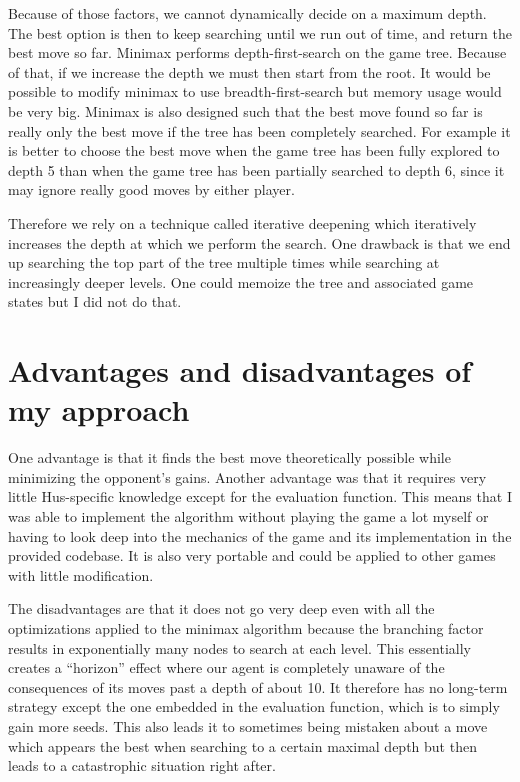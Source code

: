 \documentclass{article}
\begin{document}
Because of those factors, we cannot dynamically decide on a maximum depth. The best option is then to keep searching until we run out of time, and return the best move so far. Minimax performs depth-first-search on the game tree. Because of that, if we increase the depth we must then start from the root. It would be possible to modify minimax to use breadth-first-search but memory usage would be very big. Minimax is also designed such that the best move found so far is really only the best move if the tree has been completely searched. For example it is better to choose the best move when the game tree has been fully explored to depth 5 than when the game tree has been partially searched to depth 6, since it may ignore really good moves by either player.

Therefore we rely on a technique called iterative deepening which iteratively increases the depth at which we perform the search. One drawback is that we end up searching the top part of the tree multiple times while searching at increasingly deeper levels. One could memoize the tree and associated game states but I did not do that.



\section{Advantages and disadvantages of my approach}
One advantage is that it finds the best move theoretically possible while minimizing the opponent's gains. Another advantage was that it requires very little Hus-specific knowledge except for the evaluation function. This means that I was able to implement the algorithm without playing the game a lot myself or having to look deep into the mechanics of the game and its implementation in the provided codebase. It is also very portable and could be applied to other games with little modification.

The disadvantages are that it does not go very deep even with all the optimizations applied to the minimax algorithm because the branching factor results in exponentially many nodes to search at each level. This essentially creates a ``horizon'' effect where our agent is completely unaware of the consequences of its moves past a depth of about 10. It therefore has no long-term strategy except the one embedded in the evaluation function, which is to simply gain more seeds. This also leads it to sometimes being mistaken about a move which appears the best when searching to a certain maximal depth but then leads to a catastrophic situation right after.
\end{document}
